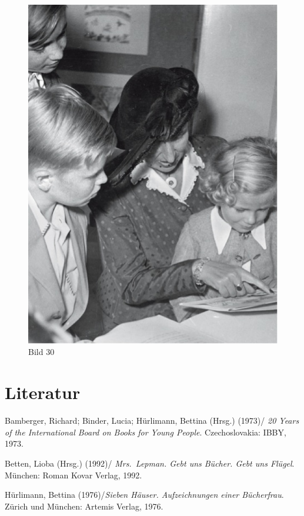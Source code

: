 \documentclass[a4paper,
fontsize=11pt,
oneside,
numbers=noperiodatend,
parskip=half-,
bibliography=totoc,
final
]{scrartcl}
\begin{document}
\begin{figure}[htbp]
\centering
\includegraphics{img/Bild30.jpg}
\caption{Bild 30}
\end{figure}

\section*{Literatur}\label{literatur}

Bamberger, Richard; Binder, Lucia; Hürlimann, Bettina (Hrsg.) (1973)/
\emph{20 Years of the International Board on Books for Young People}.
Czechoslovakia: IBBY, 1973.

Betten, Lioba (Hrsg.) (1992)/ \emph{Mrs.~Lepman. Gebt uns Bücher. Gebt
uns Flügel}. München: Roman Kovar Verlag, 1992.

Hürlimann, Bettina (1976)/\emph{Sieben Häuser. Aufzeichnungen einer
Bücherfrau}. Zürich und München: Artemis Verlag, 1976.
\end{document}

